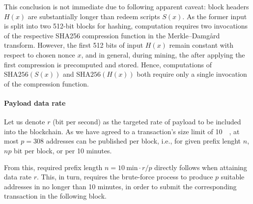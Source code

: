 \documentclass[10pt,a4paper,twocolumn]{article}
\begin{document}
This conclusion is not immediate due to following apparent caveat: block headers $H(x)$ are substantially longer than redeem scripts $S(x)$.
As the former input is split into two 512-bit blocks for hashing, computation requires two invocations of the respective {SHA256} compression function in the Merkle–Damgård transform.
However, the first 512 bits of input $H(x)$ remain constant with respect to chosen nonce $x$, and in general, during mining, the  after applying the first compression is precomputed and stored.
Hence, computations of $\text{{SHA256}}(S(x))$ and $\text{{SHA256}}(H(x))$ both require only a single invocation of the compression function.

\paragraph{Payload data rate}
Let us denote $r$ (bit per second) as the targeted rate of payload to be included into the blockchain.
As we have agreed to a transaction's size limit of \SI{10}{\kilo\byte}, at most $p=308$ addresses can be published per block, i.e., for given prefix lenght $n$, $np$ bit per block, or per 10 minutes. 

From this, required prefix length $n=\SI{10}{\minute}\cdot r/p$ directly follows when attaining data rate $r$.
This, in turn, requires the brute-force process to produce $p$ suitable addresses in no longer than 10 minutes, in order to submit the corresponding transaction in the following block.
\end{document}
